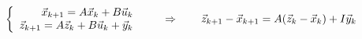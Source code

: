 \documentclass{article}
\begin{document}
\thispagestyle{empty}

$$
\left \{ \begin{array}{r l}
\vec{x}_{k+1} = A \vec{x}_k + B\vec{u}_k\\
\vec{z}_{k+1} = A \vec{z}_k + B\vec{u}_k + \vec{y}_k
\end{array} \right.
\qquad
\Rightarrow
\qquad
\vec{z}_{k+1}-\vec{x}_{k+1} = A(\vec{z}_k-\vec{x}_k) + I \vec{y}_k
$$
\end{document}
